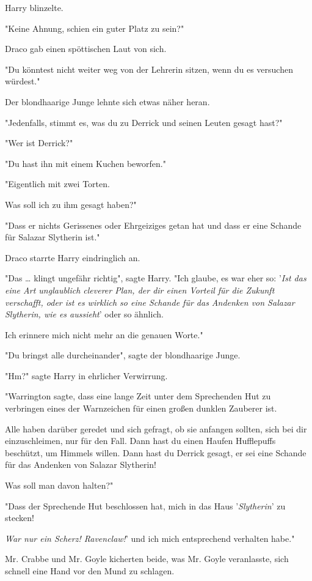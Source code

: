 {Harry blinzelte.

"Keine Ahnung, schien ein guter Platz zu sein?"

Draco gab einen spöttischen Laut von sich.

"Du könntest nicht weiter weg von der Lehrerin sitzen, wenn du es versuchen würdest."

Der blondhaarige Junge lehnte sich etwas näher heran.

"Jedenfalls, stimmt es, was du zu Derrick und seinen Leuten gesagt hast?"

"Wer ist Derrick?"

"Du hast ihn mit einem Kuchen beworfen."

"Eigentlich mit zwei Torten.

Was soll ich zu ihm gesagt haben?"

"Dass er nichts Gerissenes oder Ehrgeiziges getan hat und dass er eine Schande für Salazar Slytherin ist."

Draco starrte Harry eindringlich an.

"Das … klingt ungefähr richtig", sagte Harry. "Ich glaube, es war eher so: '\emph{Ist das eine Art unglaublich cleverer Plan, der dir einen Vorteil für die Zukunft verschafft, oder ist es wirklich so eine Schande für das Andenken von Salazar Slytherin, wie es aussieht}' oder so ähnlich.

Ich erinnere mich nicht mehr an die genauen Worte."

"Du bringst alle durcheinander", sagte der blondhaarige Junge.

"Hm?" sagte Harry in ehrlicher Verwirrung.

"Warrington sagte, dass eine lange Zeit unter dem Sprechenden Hut zu verbringen eines der Warnzeichen für einen großen dunklen Zauberer ist.

Alle haben darüber geredet und sich gefragt, ob sie anfangen sollten, sich bei dir einzuschleimen, nur für den Fall. Dann hast du einen Haufen Hufflepuffs beschützt, um Himmels willen. Dann hast du Derrick gesagt, er sei eine Schande für das Andenken von Salazar Slytherin!

Was soll man davon halten?"

"Dass der Sprechende Hut beschlossen hat, mich in das Haus '\emph{Slytherin}' zu stecken!

\emph{War nur ein Scherz! Ravenclaw!}' und ich mich entsprechend verhalten habe."

Mr. Crabbe und Mr. Goyle kicherten beide, was Mr. Goyle veranlasste, sich schnell eine Hand vor den Mund zu schlagen.

}
